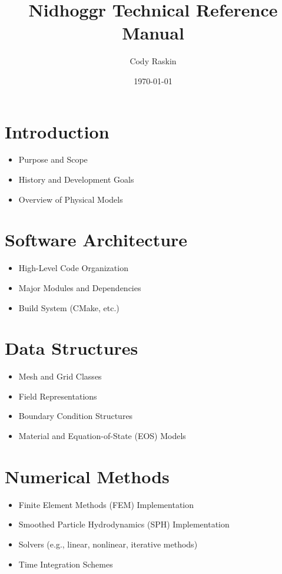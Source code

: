 \documentclass[12pt]{article}
\title{Nidhoggr Technical Reference Manual}
\author{Cody Raskin}
\date{\today}
\begin{document}
	
	\maketitle
	
	\tableofcontents
	\newpage
	
	\section{Introduction}
	\begin{itemize}
		\item Purpose and Scope
		\item History and Development Goals
		\item Overview of Physical Models
	\end{itemize}
	
	\section{Software Architecture}
	\begin{itemize}
		\item High-Level Code Organization
		\item Major Modules and Dependencies
		\item Build System (CMake, etc.)
	\end{itemize}
	
	\section{Data Structures}
	\begin{itemize}
		\item Mesh and Grid Classes
		\item Field Representations
		\item Boundary Condition Structures
		\item Material and Equation-of-State (EOS) Models
	\end{itemize}
	
	\section{Numerical Methods}
	\begin{itemize}
		\item Finite Element Methods (FEM) Implementation
		\item Smoothed Particle Hydrodynamics (SPH) Implementation
		\item Solvers (e.g., linear, nonlinear, iterative methods)
		\item Time Integration Schemes
	\end{itemize}
	
\end{document}
